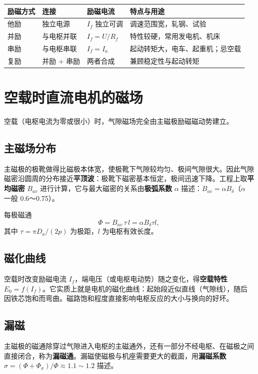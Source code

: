 \begin{center}
\begin{tabular}{@{}p{1.8cm}p{3.4cm}p{3.0cm}p{4.4cm}@{}}
\toprule
励磁方式 & 连接 & 励磁电流 & 特点与用途 \\
\midrule
他励 & 独立电源 & $I_f$ 独立可调 & 调速范围宽，轧钢、试验 \\
并励 & 与电枢并联 & $I_f=U/R_f$ & 特性较硬，常用发电机、机床 \\
串励 & 与电枢串联 & $I_f=I_a$ & 起动转矩大，电车、起重机；忌空载 \\
复励 & 并励 + 串励 & 两者合成 & 兼顾稳定性与起动转矩 \\
\bottomrule
\end{tabular}
\end{center}

\section{空载时直流电机的磁场}

空载（电枢电流为零或很小）时，气隙磁场完全由主磁极励磁磁动势建立。

\subsection{主磁场分布}
主磁极的极靴做得比磁极本体宽，使极靴下气隙较均匀、极间气隙很大。因此气隙磁密沿圆周的分布接近\textbf{平顶波}：极靴下磁密基本恒定，极间迅速下降。工程上取\textbf{平均磁密} $B_{av}$ 进行计算，它与最大磁密的关系由\textbf{极弧系数} $\alpha$ 描述：$B_{av}=\alpha B_\delta$（$\alpha$ 一般 0.6～0.75）。

每极磁通
\begin{equation}
\Phi=B_{av}\,\tau\,l=\alpha B_\delta\tau l ,
\end{equation}
其中 $\tau=\pi D_a/(2p)$ 为极距，$l$ 为电枢有效长度。

\subsection{磁化曲线}
空载时改变励磁电流 $I_f$，端电压（或电枢电动势）随之变化，得\textbf{空载特性} $E_0=f(I_f)$。它实质上就是电机的磁化曲线：起始段近似直线（气隙线），随后因铁芯饱和而弯曲。磁路饱和程度直接影响电枢反应的大小与换向的好坏。

\subsection{漏磁}
主磁极的磁通除穿过气隙进入电枢的主磁通外，还有一部分不经电枢、在磁极之间直接闭合，称为\textbf{漏磁通}。漏磁使磁极与机座需要更大的截面，用\textbf{漏磁系数} $\sigma=(\Phi+\Phi_\sigma)/\Phi\approx1.1\sim1.2$ 描述。

